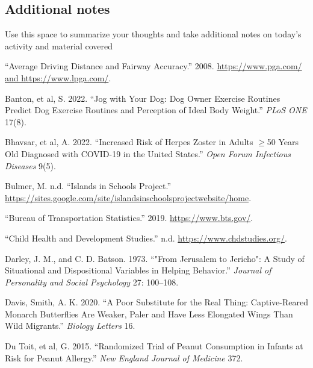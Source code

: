 \documentclass[
]{report}
\newlength{\cslhangindent}
\newenvironment{CSLReferences}[2] %
 {\begin{list}{}{%
  \setlength{\itemindent}{0pt}
  \setlength{\leftmargin}{0pt}
  \setlength{\parsep}{0pt}
  \ifodd #1
   \setlength{\leftmargin}{\cslhangindent}
   \setlength{\itemindent}{-1\cslhangindent}
  \fi
  \setlength{\itemsep}{#2\baselineskip}}}
 {\end{list}}
\begin{document}
\subsection{Additional notes}\label{additional-notes-2}

Use this space to summarize your thoughts and take additional notes on today's activity and material covered

\newpage

\label{refs}
\begin{CSLReferences}{1}{0}
{``Average Driving Distance and Fairway Accuracy.''} 2008. \href{https://www.pga.com/\%20and\%20https://www.lpga.com/}{https://www.pga.com/ and https://www.lpga.com/}.

Banton, et al, S. 2022. {``Jog with Your Dog: Dog Owner Exercise Routines Predict Dog Exercise Routines and Perception of Ideal Body Weight.''} \emph{PLoS ONE} 17(8).

Bhavsar, et al, A. 2022. {``Increased Risk of Herpes Zoster in Adults \(\geq\)50 Years Old Diagnosed with COVID-19 in the United States.''} \emph{Open Forum Infectious Diseases} 9(5).

Bulmer, M. n.d. {``Islands in Schools Project.''} \url{https://sites.google.com/site/islandsinschoolsprojectwebsite/home}.

{``Bureau of Transportation Statistics.''} 2019. \url{https://www.bts.gov/}.

{``Child Health and Development Studies.''} n.d. \url{https://www.chdstudies.org/}.

Darley, J. M., and C. D. Batson. 1973. {``"From Jerusalem to Jericho": A Study of Situational and Dispositional Variables in Helping Behavior.''} \emph{Journal of Personality and Social Psychology} 27: 100--108.

Davis, Smith, A. K. 2020. {``A Poor Substitute for the Real Thing: Captive-Reared Monarch Butterflies Are Weaker, Paler and Have Less Elongated Wings Than Wild Migrants.''} \emph{Biology Letters} 16.

Du Toit, et al, G. 2015. {``Randomized Trial of Peanut Consumption in Infants at Risk for Peanut Allergy.''} \emph{New England Journal of Medicine} 372.


\end{CSLReferences}
\end{document}
